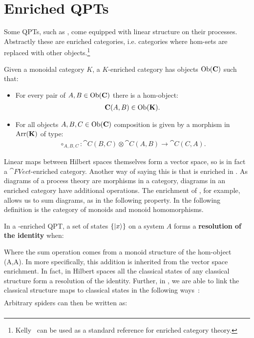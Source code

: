 \section{Enriched QPTs}
\label{sec:enrichedQPTs}
Some QPTs, such as , come equipped with linear structure on their processes. Abstractly these are enriched categories, i.e. categories where hom-sets are replaced with other objects.\footnote{Kelly~\cite{kelly1982basic} can be used as a standard reference for enriched category theory.}

\begin{defn}
\label{def:enrichedcat}
Given a monoidal category $K$, a $K$-enriched category  has objects $\mbox{Ob}(\mathbf{C})$ such that:
\begin{itemize}
\item For every pair of $A,B\in\mbox{Ob}(\mathbf{C})$ there is a hom-object:
\begin{align}
\mathbf{C}(A,B)\in \mbox{Ob}(\mathbf{K}).
\end{align}
\item For all objects $A,B,C\in\mbox{Ob}(\mathbf{C})$ composition is given by a morphism in $\mbox{Arr}(\mathbf{K})$ of type:
\begin{align}
 \circ_{A,B,C}:\cat{C}(B,C)\otimes\cat{C}(A,B)\to\cat{C}(C,A).
\end{align}
\end{itemize}
\end{defn}

Linear maps between Hilbert spaces themselves form a vector space, so  is in fact a $\cat{FVect}$-enriched category. Another way of saying this is that  is enriched in . As diagrams of a process theory are morphisms in a category, diagrams in an enriched category have additional operations. The  enrichment of , for example, allows us to sum diagrams, as in the following property. In the following definition  is the category of monoids and monoid homomorphisms.


\begin{defn}
\label{def:resid}
In a -enriched QPT, a set of states $\{| x \rangle\}$ on a system $A$ forms a \textbf{resolution of the identity} when:
\begin{equation}
\label{eq:ResolutionId}

\end{equation}
\end{defn}

\noindent Where the sum operation comes from a monoid structure of the hom-object (A,A). In  more specifically, this addition is inherited  from the vector space enrichment. In fact, in Hilbert spaces all the classical states of any classical structure form a resolution of the identity. Further, in , we are able to link the classical structure maps to classical states in the following ways~\cite{coecke2015generalised}:
\begin{align}
\label{eq:spidersums}

\end{align}
Arbitrary spiders can then be written as:
\begin{align}

\end{align}

